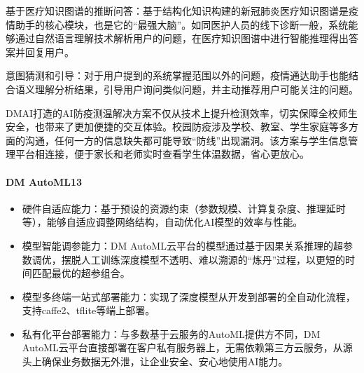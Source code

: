 \documentclass[letterpaper,10pt,english]{sphinxmanual}
\begin{document}
基于医疗知识图谱的推断问答：基于结构化知识构建的新冠肺炎医疗知识图谱是疫情助手的核心模块，也是它的“最强大脑”。如同医护人员的线下诊断一般，系统能够通过自然语言理解技术解析用户的问题，在医疗知识图谱中进行智能推理得出答案并回复用户。

意图猜测和引导：对于用户提到的系统掌握范围以外的问题，疫情通达助手也能结合语义理解分析结果，引导用户询问类似问题，并主动推荐用户可能关注的问题。

DMAI打造的AI防疫测温解决方案不仅从技术上提升检测效率，切实保障全校师生安全，也带来了更加便捷的交互体验。校园防疫涉及学校、教室、学生家庭等多方面的沟通，任何一方的信息缺失都可能导致“防线”出现漏洞。该方案与学生信息管理平台相连接，便于家长和老师实时查看学生体温数据，省心更放心。%
\begin{footnote}[1016]\sphinxAtStartFootnote
{}
%
\end{footnote}


\paragraph{DM AutoML13\sphinxfootnotemark[1017]}
\label{\detokenize{chapter_AI_company/dm-ai:dm-automl13}}%
\begin{footnotetext}[1017]\sphinxAtStartFootnote
{}
%
\end{footnotetext}\ignorespaces \begin{itemize}
\item {} 
硬件自适应能力：基于预设的资源约束（参数规模、计算复杂度、推理延时等），能够自适应调整网络结构，自动优化AI模型的效率与性能。

\item {} 
模型智能调参能力：DM
AutoML云平台的模型通过基于因果关系推理的超参数调优，摆脱人工训练深度模型不透明、难以溯源的“炼丹”过程，以更短的时间匹配最优的超参组合。

\item {} 
模型多终端一站式部署能力：实现了深度模型从开发到部署的全自动化流程，支持caffe2、tf\sphinxhyphen{}lite等端上部署。

\item {} 
私有化平台部署能力：与多数基于云服务的AutoML提供方不同，DM
AutoML云平台直接部署在客户私有服务器上，无需依赖第三方云服务，从源头上确保业务数据无外泄，让企业安全、安心地使用AI能力。

\end{itemize}
\end{document}
